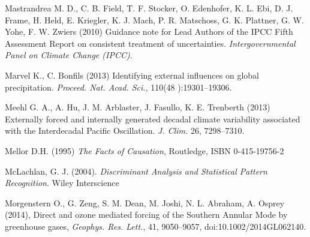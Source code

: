 \documentclass[12pt]{article}
\begin{document}
\begin{thebibliography}{00}

Mastrandrea M. D., C. B. Field, T. F. Stocker, O. Edenhofer, K. L. Ebi, D. J. Frame, H. Held, E. Kriegler, K. J. Mach, P. R. Matschoss, G. K. Plattner, G. W. Yohe, F. W. Zwiers (2010) Guidance note for Lead Authors of the IPCC Fifth Assessment Report on consistent treatment of uncertainties. {\em Intergovernmental Panel on Climate Change (IPCC)}.


%

Marvel K., C. Bonfils (2013) Identifying external influences on global precipitation. {\em Proceed. Nat. Acad. Sci.}, 110(48	):19301--19306.

Meehl G. A., A. Hu, J. M. Arblaster, J. Fasullo, K. E. Trenberth (2013) Externally forced and internally generated decadal climate variability associated with the Interdecadal Pacific Oscillation. {\em J. Clim.} 26, 7298--7310.

Mellor D.H. (1995) {\em The Facts of Causation}, Routledge, ISBN 0-415-19756-2

McLachlan, G. J. (2004). {\em Discriminant Analysis and Statistical Pattern Recognition}. Wiley Interscience



Morgenstern O., G. Zeng, S. M. Dean, M. Joshi, N. L. Abraham, A. Osprey (2014), Direct and ozone mediated forcing of the Southern Annular Mode by greenhouse gases, {\em Geophys. Res. Lett.}, 41, 9050--9057, doi:10.1002/2014GL062140.


\end{thebibliography}
\end{document}
